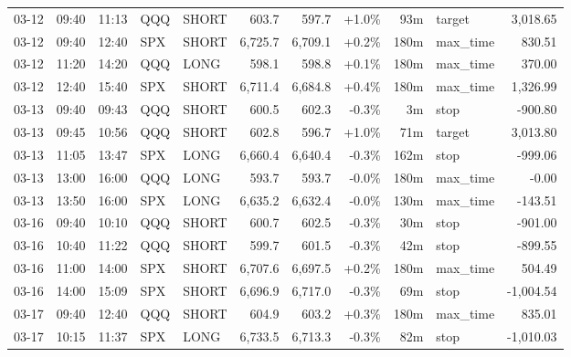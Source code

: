 \documentclass[11pt,a4paper,twoside]{article}
\begin{document}
\begin{center}
\begin{longtable}{>{\color{txtmain}}l l l l l r r r r >{\color{txtmain}}l r}
03-12 & 09:40 & 11:13 & QQQ & SHORT & 603.7 & 597.7 & \textcolor{wingreen}{+1.0\%} & 93m & target & \textcolor{wingreen}{3,018.65} \\
03-12 & 09:40 & 12:40 & SPX & SHORT & 6,725.7 & 6,709.1 & \textcolor{wingreen}{+0.2\%} & 180m & max\_time & \textcolor{wingreen}{830.51} \\
03-12 & 11:20 & 14:20 & QQQ & LONG & 598.1 & 598.8 & \textcolor{wingreen}{+0.1\%} & 180m & max\_time & \textcolor{wingreen}{370.00} \\
03-12 & 12:40 & 15:40 & SPX & SHORT & 6,711.4 & 6,684.8 & \textcolor{wingreen}{+0.4\%} & 180m & max\_time & \textcolor{wingreen}{1,326.99} \\
03-13 & 09:40 & 09:43 & QQQ & SHORT & 600.5 & 602.3 & \textcolor{lossred}{-0.3\%} & 3m & stop & \textcolor{lossred}{-900.80} \\
03-13 & 09:45 & 10:56 & QQQ & SHORT & 602.8 & 596.7 & \textcolor{wingreen}{+1.0\%} & 71m & target & \textcolor{wingreen}{3,013.80} \\
03-13 & 11:05 & 13:47 & SPX & LONG & 6,660.4 & 6,640.4 & \textcolor{lossred}{-0.3\%} & 162m & stop & \textcolor{lossred}{-999.06} \\
03-13 & 13:00 & 16:00 & QQQ & LONG & 593.7 & 593.7 & \textcolor{lossred}{-0.0\%} & 180m & max\_time & \textcolor{lossred}{-0.00} \\
03-13 & 13:50 & 16:00 & SPX & LONG & 6,635.2 & 6,632.4 & \textcolor{lossred}{-0.0\%} & 130m & max\_time & \textcolor{lossred}{-143.51} \\
03-16 & 09:40 & 10:10 & QQQ & SHORT & 600.7 & 602.5 & \textcolor{lossred}{-0.3\%} & 30m & stop & \textcolor{lossred}{-901.00} \\
03-16 & 10:40 & 11:22 & QQQ & SHORT & 599.7 & 601.5 & \textcolor{lossred}{-0.3\%} & 42m & stop & \textcolor{lossred}{-899.55} \\
03-16 & 11:00 & 14:00 & SPX & SHORT & 6,707.6 & 6,697.5 & \textcolor{wingreen}{+0.2\%} & 180m & max\_time & \textcolor{wingreen}{504.49} \\
03-16 & 14:00 & 15:09 & SPX & SHORT & 6,696.9 & 6,717.0 & \textcolor{lossred}{-0.3\%} & 69m & stop & \textcolor{lossred}{-1,004.54} \\
03-17 & 09:40 & 12:40 & QQQ & SHORT & 604.9 & 603.2 & \textcolor{wingreen}{+0.3\%} & 180m & max\_time & \textcolor{wingreen}{835.01} \\
03-17 & 10:15 & 11:37 & SPX & LONG & 6,733.5 & 6,713.3 & \textcolor{lossred}{-0.3\%} & 82m & stop & \textcolor{lossred}{-1,010.03} \\

\end{longtable}
\end{center}
\end{document}
